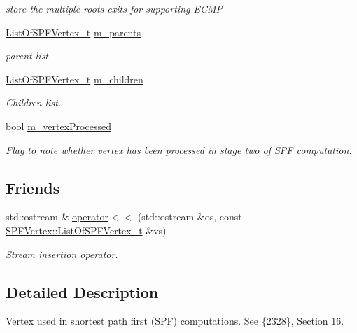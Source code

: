 \begin{DoxyCompactItemize}
\begin{DoxyCompactList}\small\item\em store the multiple root\textquotesingle{}s exits for supporting E\+C\+MP \end{DoxyCompactList}\item 
\hyperlink{classns3_1_1SPFVertex_a505cf50e80726f5860b32e9dc34b6c9e}{List\+Of\+S\+P\+F\+Vertex\+\_\+t} \hyperlink{classns3_1_1SPFVertex_af644854d7d83ccd2200a657dceaea0f8}{m\+\_\+parents}
\begin{DoxyCompactList}\small\item\em parent list \end{DoxyCompactList}\item 
\hyperlink{classns3_1_1SPFVertex_a505cf50e80726f5860b32e9dc34b6c9e}{List\+Of\+S\+P\+F\+Vertex\+\_\+t} \hyperlink{classns3_1_1SPFVertex_af075e299721e613e5514392c3b3122c4}{m\+\_\+children}
\begin{DoxyCompactList}\small\item\em Children list. \end{DoxyCompactList}\item 
bool \hyperlink{classns3_1_1SPFVertex_ac629016bfe46ad93090d6ae92782769d}{m\+\_\+vertex\+Processed}
\begin{DoxyCompactList}\small\item\em Flag to note whether vertex has been processed in stage two of S\+PF computation. \end{DoxyCompactList}\end{DoxyCompactItemize}
\subsection*{Friends}
\begin{DoxyCompactItemize}
\item 
std\+::ostream \& \hyperlink{classns3_1_1SPFVertex_aaab1fc097eed9bf298b4b71c8e247b5a}{operator$<$$<$} (std\+::ostream \&os, const \hyperlink{classns3_1_1SPFVertex_a505cf50e80726f5860b32e9dc34b6c9e}{S\+P\+F\+Vertex\+::\+List\+Of\+S\+P\+F\+Vertex\+\_\+t} \&vs)
\begin{DoxyCompactList}\small\item\em Stream insertion operator. \end{DoxyCompactList}\end{DoxyCompactItemize}


\subsection{Detailed Description}
Vertex used in shortest path first (S\+PF) computations. See \{2328\}, Section 16. 

